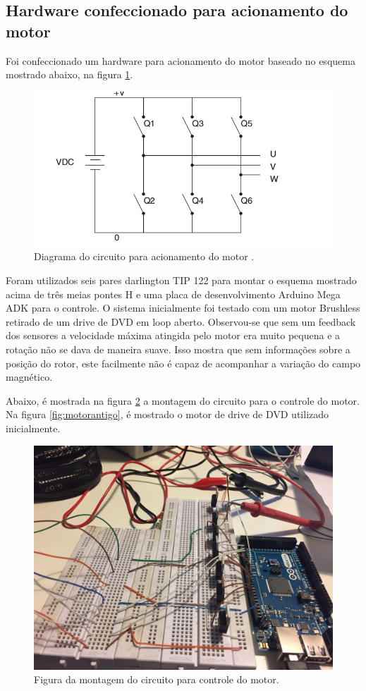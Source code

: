 \documentclass[a4paper,11pt]{article}
\begin{document}
		\subsection{Hardware confeccionado para acionamento do motor}
		
		Foi confeccionado um hardware para acionamento do motor baseado no esquema mostrado abaixo, na figura \ref{fig:diagrama}.
		
		\begin{figure}[ht]
			\centering
			\includegraphics[width=0.7\linewidth]{images/circuitdiagram}
			\caption{Diagrama do circuito para acionamento do motor \cite{atmeldiagrama}.}
			\label{fig:diagrama}
		\end{figure}
	
		Foram utilizados seis pares darlington TIP 122 para montar o esquema mostrado acima de três meias pontes H e uma placa de desenvolvimento Arduino Mega ADK para o controle. O sistema inicialmente foi testado com um motor Brushless retirado de um drive de DVD em loop aberto. Observou-se que sem um feedback dos sensores a velocidade máxima atingida pelo motor era muito pequena e a rotação não se dava de maneira suave. Isso mostra que sem informações sobre a posição do rotor, este facilmente não é capaz de acompanhar a variação do campo magnético.
		
		Abaixo, é mostrada na figura \ref{fig:montagemcircuito} a montagem do circuito para o controle do motor. Na figura \ref{fig:motorantigo}, é mostrado o motor de drive de DVD utilizado inicialmente.
		
		\begin{figure}[ht]
			\centering
			\includegraphics[width=0.5\linewidth]{images/montagemcircuito}
			\caption{Figura da montagem do circuito para controle do motor.}
			\label{fig:montagemcircuito}
		\end{figure}
		
\end{document}
